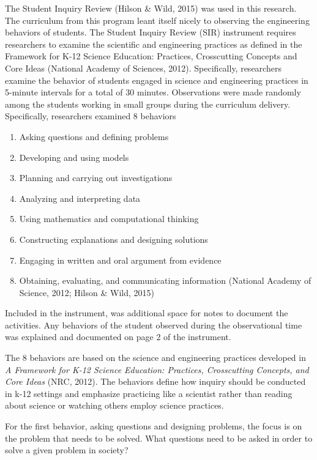 \documentclass[11.5pt]{sig-alternate} %
\begin{document}
\begin{large}
The Student Inquiry Review (Hilson \& Wild, 2015) was used in this research. The curriculum from this program leant itself nicely to observing the engineering behaviors of students. The Student Inquiry Review (SIR) instrument requires researchers to examine the scientific and engineering practices as defined in the Framework for K-12 Science Education: Practices, Crosscutting Concepts and Core Ideas (National Academy of Sciences, 2012). Specifically, researchers examine the behavior of students engaged in science and engineering practices in 5-minute intervals for a total of 30 minutes. Observations were made randomly among the students working in small groups during the curriculum delivery. Specifically, researchers examined 8 behaviors  
\newpage
\begin{enumerate}[nosep]
    \item Asking questions and defining problems
    \item Developing and using models
    \item Planning and carrying out investigations
    \item Analyzing and interpreting data
    \item Using mathematics and computational thinking
    \item Constructing explanations and designing solutions
    \item Engaging in written and oral argument from evidence
    \item Obtaining, evaluating, and communicating information (National Academy of Science, 2012; Hilson \& Wild, 2015)
\end{enumerate}

Included in the instrument, was additional space for notes to document the activities. Any behaviors of the student observed during the observational time was explained and documented on page 2 of the instrument. 

The 8 behaviors are based on the science and engineering practices developed in \textit{A Framework for K-12 Science Education: Practices, Crosscutting Concepts, and Core Ideas} (NRC, 2012). The behaviors define how inquiry should be conducted in k-12 settings and emphasize practicing like a scientist rather than reading about science or watching others employ science practices.  

For the first behavior, asking questions and designing problems, the focus is on the problem that needs to be solved. What questions need to be asked in order to solve a given problem in society?


\end{large}
\end{document}
